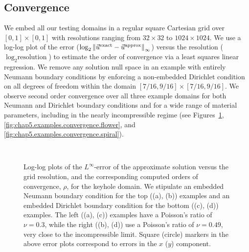 \subsection{Convergence} \label{subsec:chap5.examples.convergence}

We embed all our testing domains in a regular square Cartesian grid over $[0,1] 
\times [0,1]$ with resolutions ranging from $32 \times 32$ to $1024 \times 1024$. We use a log-log plot of the error ($\log_2 \left\lVert \vec{u}^{\text{exact}} - \vec{u}^{\text{approx}} \right\rVert_{\infty}$) versus the resolution ($\log_2 \text{resolution}$) to estimate the order of convergence via a least squares linear regression. We remove any solution null space in an example with entirely Neumann boundary conditions by enforcing a non-embedded Dirichlet condition on all degrees of freedom within the domain $[7/16,9/16] \times [7/16,9/16]$. We observe second order convergence over all three example domains for both Neumann and Dirichlet boundary conditions and for a wide range of material parameters, including in the nearly incompressible regime (see Figures~\ref{fig:chap5.examples.convergence.ginkgo}, \ref{fig:chap5.examples.convergence.flower}, and \ref{fig:chap5.examples.convergence.spiral}).

\setlength{\figurewidth}{0.49\textwidth}
\begin{figure}[htbp]
\centering
{}
 \\
\caption{Log-log plots of the $L^{\infty}$-error of the approximate solution versus the grid resolution, and the corresponding computed orders of convergence, $\rho$, for the keyhole domain. We stipulate an embedded Neumann boundary condition for the top ((a), (b)) examples and an embedded Dirichlet boundary condition for the bottom ((c), (d)) examples. The left ((a), (c)) examples have a Poisson's ratio of $\nu = 0.3$, while the right ((b), (d)) use a Poisson's ratio of $\nu = 0.49$, very close to the incompressible limit. Square (circle) markers in the above error plots correspond to errors in the $x$ ($y$) component.}
\label{fig:chap5.examples.convergence.ginkgo}
\end{figure}

